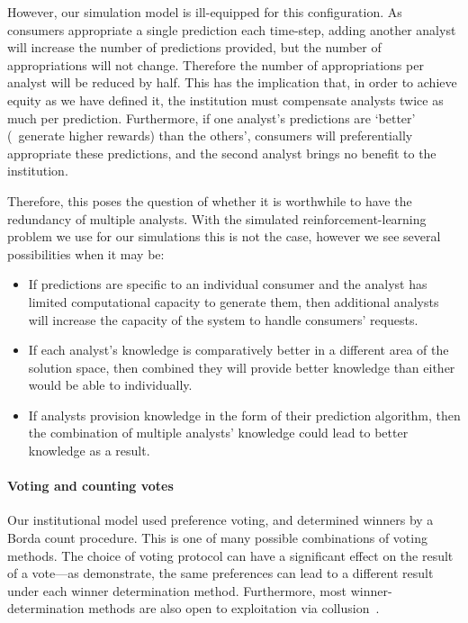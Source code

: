 However, our simulation model is ill-equipped for this configuration. As
consumers appropriate a single prediction each time-step, adding another
analyst will increase the number of predictions provided, but the number 
of appropriations will not change. Therefore the number of appropriations 
per analyst will be reduced by half. This has
the implication that, in order to achieve equity as we have defined it, the
institution must compensate analysts twice as much per prediction.
Furthermore, if one analyst's predictions are `better' (\ie\ generate higher rewards) than the others', consumers will preferentially appropriate these
predictions, and the second analyst brings no benefit to the institution.

Therefore, this poses the question of whether it is worthwhile to have the
redundancy of multiple analysts. With the simulated reinforcement-learning
problem we use for our simulations this is not the case, however we see several possibilities when
it may be:

\begin{itemize}
\item If predictions are specific to an individual consumer and the analyst has limited computational capacity to generate them, then additional analysts will increase the capacity of the system to handle consumers' requests.
\item If each analyst's knowledge is comparatively better in a different area of the solution space, then combined they will provide better knowledge than either would be able to individually.
\item If analysts provision knowledge in the form of their prediction algorithm, then the combination of multiple analysts' knowledge could lead to better knowledge as a result. 
\end{itemize}

\paragraph{Voting and counting votes} Our institutional model used preference
voting, and determined winners by a Borda count procedure. This is one of many
possible combinations of voting methods. The choice of voting protocol can have
a significant effect on the result of a vote---as \citet{Pitt2011b}
demonstrate, the same preferences can lead to a different result under each
winner determination method. Furthermore, most winner-determination methods
are also open to exploitation via collusion~\citep{Conitzer2007}.

